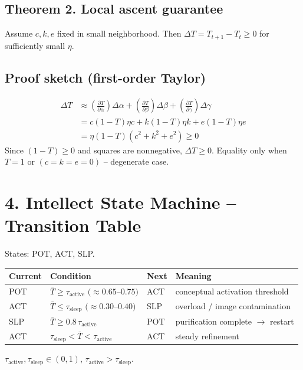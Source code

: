 \documentclass[11pt]{article}
\begin{document}
\subsection*{Theorem 2. Local ascent guarantee}
Assume $c,k,e$ fixed in small neighborhood. Then $\Delta T = T_{t+1} - T_t \geq 0$ for sufficiently small $\eta$.

\subsection*{Proof sketch (first-order Taylor)}
\begin{align*}
    \Delta T &\approx \left(\frac{\partial T}{\partial \alpha}\right) \Delta \alpha + \left(\frac{\partial T}{\partial \beta}\right) \Delta \beta + \left(\frac{\partial T}{\partial \gamma}\right) \Delta \gamma\\
    &= c (1-T) \eta c + k (1-T) \eta k + e (1-T) \eta e\\
    &= \eta (1-T) (c^2 + k^2 + e^2) \geq 0
\end{align*}
Since $(1-T) \geq 0$ and squares are nonnegative, $\Delta T \geq 0$. Equality only when $T=1$ or $(c=k=e=0)$ -- degenerate case.

\section*{4. Intellect State Machine -- Transition Table}
States: POT, ACT, SLP.

\begin{center}
\begin{tabular}{|>{\raggedright\arraybackslash}p{2cm}|>{\raggedright\arraybackslash}p{5cm}|>{\raggedright\arraybackslash}p{2cm}|>{\raggedright\arraybackslash}p{5cm}|}
\hline
\textbf{Current} & \textbf{Condition} & \textbf{Next} & \textbf{Meaning}\\
\hline
POT & $\bar{T} \geq \tau_{\text{active}}$ $(\approx 0.65$--$0.75)$ & ACT & conceptual activation threshold \\
\hline
ACT & $\bar{T} \leq \tau_{\text{sleep}}$ $(\approx 0.30$--$0.40)$ & SLP & overload / image contamination \\
\hline
SLP & $\bar{T} \geq 0.8\,\tau_{\text{active}}$ & POT & purification complete $\to$ restart \\
\hline
ACT & $\tau_{\text{sleep}} < \bar{T} < \tau_{\text{active}}$ & ACT & steady refinement \\
\hline
\end{tabular}
\end{center}
\noindent $\tau_{\text{active}}, \tau_{\text{sleep}} \in (0,1)$, $\tau_{\text{active}} > \tau_{\text{sleep}}$.
\end{document}
